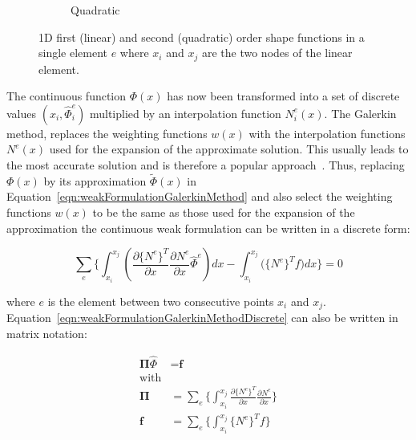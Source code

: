 \begin{figure}[htb]
\begin{subfigure}[b]{0.45\textwidth}
                \caption{Quadratic}
                \label{fig:quadraticShapeFunction}
        \end{subfigure}
        \caption[Different shape functions in a single element]{1D first (linear) and second (quadratic) order shape functions in a single element $e$ where $x_{i}$ and $x_{j}$ are the two nodes of the linear element.}
        \label{fig:shapeFunction}
\end{figure}

The continuous function $\Phi(x)$ has now been transformed into a set of discrete values $(x_{i},\hat{\Phi}_{i}^{e})$ multiplied by an interpolation function $N_{i}^{e}(x)$. The Galerkin method, replaces the weighting functions $w(x)$ with the interpolation functions $N^{e}(x)$ used for the expansion of the approximate solution. This usually leads to the most accurate solution and is therefore a popular approach~\cite{Jin2014,Ciarlet1978,Brenner2008,Oden2012}. Thus, replacing $\Phi(x)$ by its approximation $\tilde{\Phi}(x)$ in Equation~\ref{eqn:weakFormulationGalerkinMethod} and also select the weighting functions $w(x)$ to be the same as those used for the expansion of the approximation the continuous weak formulation can be written in a discrete form:

\begin{equation}
 	\sum_{e}\biggl\{\int_{x_{i}}^{x_{j}}\left(\frac{\partial \{N^{e}\}^{T}}{\partial x}\frac{\partial N^{e}}{\partial x}\hat{\Phi}^{e}\right)dx - \int_{x_{i}}^{x_{j}}\bigg(\{N^{e}\}^{T}f\bigg)dx \biggl\} = 0
 	\label{eqn:weakFormulationGalerkinMethodDiscrete}
\end{equation}

where $e$ is the element between two consecutive points $x_{i}$ and $x_{j}$. Equation~\ref{eqn:weakFormulationGalerkinMethodDiscrete} can also be written in matrix notation:

\begin{align}
	\mathbf{\Pi}\hat{\Phi} &= \textbf{f} \label{eqn:matrixNotationGalerkinMethod}\\	
	\text{with} \nonumber \\
	\mathbf{\Pi} &= \sum_{e} \biggl\{ \int_{x_{i}}^{x_{j}} \frac{\partial \{N^{e}\}^{T}}{\partial x}\frac{\partial N^{e}}{\partial x} \biggl\} \label{eqn:eqn:stiffnessMatrixGalerkinMethod}\\
	\textbf{f} &= \sum_{e} \biggl\{ \int_{x_{i}}^{x_{j}} \{N^{e}\}^{T}f \biggl\} \label{eqn:rightHandSideGalerkinMethod}
\end{align}
	
